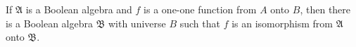 If $\mathfrak{A}$ is a Boolean algebra and $f$ is a one-one function from $A$ onto $B$, then there is a Boolean algebra $\mathfrak{B}$ with universe $B$ such that $f$ is an isomorphism from $\mathfrak{A}$ onto $\mathfrak{B}$.
